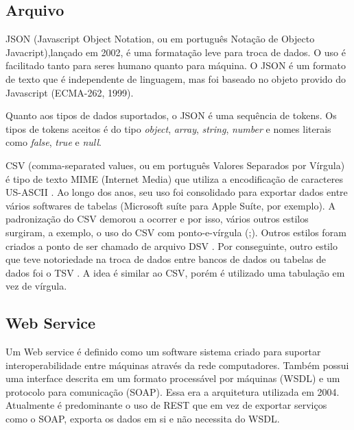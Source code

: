 \documentclass[
	12pt,				%
	openright,			%
	twoside,			%
	a4paper,			%
	english,			%
	brazil				%
	]{abntex2}
\begin{document}
		\subsection{Arquivo}
		JSON \cite{json-rfc-8259} \cite{json-jsonOrg} (Javascript Object Notation, ou em português Notação de Objecto Javacript),lançado em 2002, é uma formatação leve para troca de dados. 
		O uso é facilitado tanto para seres humano quanto para máquina.
		O JSON é um formato de texto que é independente de linguagem, mas foi baseado no objeto provido do Javascript (ECMA-262, 1999).
		\par
		Quanto aos tipos de dados suportados, o JSON \cite{json-rfc-8259} é uma sequência de tokens. 
		Os tipos de tokens aceitos é do tipo \textit{object}, \textit{array}, \textit{string}, \textit{number} e nomes literais como \textit{false}, \textit{true} e \textit{null}.
		\par
		CSV \cite{csv-rfc-4180} (comma-separated values, ou em português Valores Separados por Vírgula) é tipo de texto MIME (Internet Media) \cite{mime-rfc-2048} que utiliza a encodificação de caracteres US-ASCII \cite{csv-rfc-7111}.
		Ao longo dos anos, seu uso foi consolidado para exportar dados entre vários softwares de tabelas (Microsoft suíte para Apple Suíte, por exemplo).
		A padronização do CSV demorou a ocorrer e por isso, vários outros estilos surgiram, a exemplo, o uso do CSV com ponto-e-vírgula (;).
		Outros estilos foram criados a ponto de ser chamado de arquivo DSV \cite{dsv}.
		Por conseguinte, outro estilo que teve notoriedade na troca de dados entre bancos de dados ou tabelas de dados foi o TSV \cite{tsv-iana}.
		A idea é similar ao CSV, porém é utilizado uma tabulação em vez de vírgula.
		
		\subsection{Web Service}
		\cite{webService-W3C}
		Um Web service é definido como um software sistema criado para suportar interoperabilidade entre máquinas através da rede computadores. Também possui uma interface descrita em um formato processável por máquinas (WSDL) e um protocolo para comunicação (SOAP). \cite{webService-W3C}
		Essa era a arquitetura utilizada em 2004. Atualmente é predominante o uso de REST que em vez de exportar serviços como o SOAP, exporta os dados em si e não necessita do WSDL. \cite{soapVSrest}
	
\end{document}
